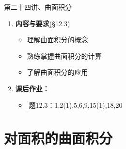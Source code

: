 
\begin{frame}{第二十四讲、曲面积分}
	\linespread{1.5}
	\begin{enumerate}
	  \item {\bf 内容与要求}{\b (\S 12.3)}
	  \begin{itemize}
		\item 理解曲面积分的概念
		\item 熟练掌握曲面积分的计算
		\item 了解曲面积分的应用
	  \vspace{1em}
	  \end{itemize}
	  \item {\bf  课后作业：}
	  \begin{itemize}
	    \item {\b 习题12.3：1,2(1),5,6,9,15(1),18,20}
	  \end{itemize}
	\end{enumerate}
\end{frame}

\section{对面积的曲面积分}

